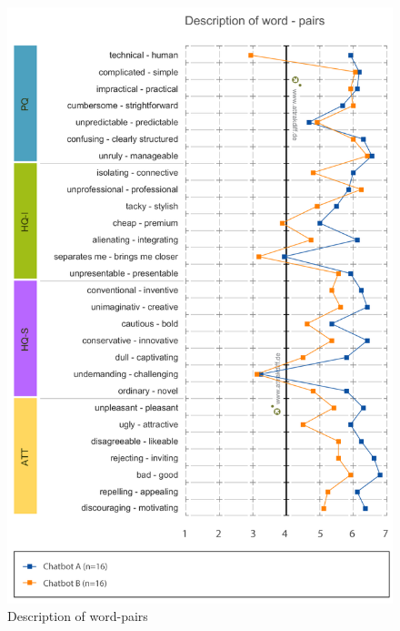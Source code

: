 \begin{figure}[h]
    \centering
    \includegraphics[scale=0.4]{figures/Description-of-word-pairs.png}
    \caption{Description of word-pairs}
    \label{fig:wordpairs}
\end{figure}
